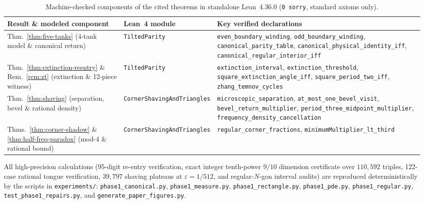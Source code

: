 \documentclass[11pt,reqno]{amsart}
\theoremstyle{definition}
\theoremstyle{remark}
\begin{document}
\begin{table}[ht]
\centering
\caption{Machine-checked components of the cited theorems in standalone Lean~4.36.0 (\texttt{0 sorry}, standard axioms only).}
\label{tab:lean-p2}
\scriptsize
\setlength{\tabcolsep}{3.5pt}
\begin{tabular}{@{}>{\raggedright\arraybackslash}p{}l>{\raggedright\arraybackslash}p{}@{}}
\toprule
Result \& modeled component & Lean~4 module & Key verified declarations \\
\midrule
Thm.~\ref{thm:five-tanks} (4-tank model \& canonical return) & \texttt{TiltedParity} & \texttt{even\_boundary\_winding}, \texttt{odd\_boundary\_winding}, \texttt{canonical\_parity\_table}, \texttt{canonical\_physical\_identity\_iff}, \texttt{canonical\_regular\_interior\_iff} \\
Thm.~\ref{thm:extinction-reentry} \& Rem.~\ref{rem:zt} (extinction \& 12-piece witness) & \texttt{TiltedParity} & \texttt{extinction\_interval}, \texttt{extinction\_threshold}, \texttt{square\_extinction\_angle\_iff}, \texttt{square\_period\_two\_iff}, \texttt{zhang\_temnov\_cycles} \\
Thm.~\ref{thm:shaving} (separation, bevel \& rational density) & \texttt{CornerShavingAndTriangles} & \texttt{microscopic\_separation}, \texttt{at\_most\_one\_bevel\_visit}, \texttt{bevel\_return\_multiplier}, \texttt{period\_three\_midpoint\_multiplier}, \texttt{frequency\_density\_cancellation} \\
Thms.~\ref{thm:corner-shadow} \& \ref{thm:half-freq-paradox} (mod-4 \& rational bound) & \texttt{CornerShavingAndTriangles} & \texttt{regular\_corner\_fractions}, \texttt{minimumMultiplier\_lt\_third} \\
\bottomrule
\end{tabular}
\end{table}

All high-precision calculations (95-digit re-entry verification, exact integer tenth-power $9/10$ dimension certificate over $110{,}592$ triples, 122-case rational tongue verification, $39{,}797$ shaving plateaus at $\varepsilon = 1/512$, and regular-$N$-gon interval audits) are reproduced deterministically by the scripts in \texttt{experiments/}: \texttt{phase1\_\allowbreak canonical.py}, \texttt{phase1\_\allowbreak measure.py}, \texttt{phase1\_\allowbreak rectangle.py}, \texttt{phase1\_\allowbreak pde.py}, \texttt{phase1\_\allowbreak regular.py}, \texttt{test\_\allowbreak phase1\_\allowbreak repairs.py}, and \texttt{generate\_\allowbreak paper\_\allowbreak figures.py}.
\end{document}
